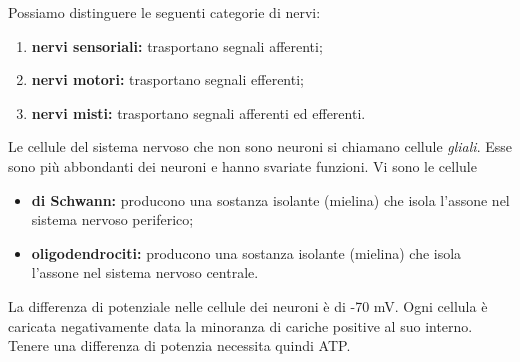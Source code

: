 \documentclass[a4paper]{article}
\begin{document}


Possiamo distinguere le seguenti categorie di nervi:
\begin{enumerate}
    \item \textbf{nervi sensoriali:} trasportano segnali afferenti;
    \item \textbf{nervi motori:} trasportano segnali efferenti;
    \item \textbf{nervi misti:} trasportano segnali afferenti ed efferenti.
\end{enumerate}



Le cellule del sistema nervoso che non sono neuroni si chiamano cellule \textit{gliali}.
Esse sono più abbondanti dei neuroni e hanno svariate funzioni.
Vi sono le cellule
\begin{itemize}
    \item \textbf{di Schwann:} producono una sostanza isolante (mielina) che isola l'assone nel sistema nervoso periferico;
    \item \textbf{oligodendrociti:} producono una sostanza isolante (mielina) che isola l'assone nel sistema nervoso centrale.
\end{itemize}


La differenza di potenziale nelle cellule dei neuroni è di -70 mV. Ogni cellula è caricata
negativamente data la minoranza di cariche positive al suo interno.
Tenere una differenza di potenzia necessita quindi ATP.
\end{document}
